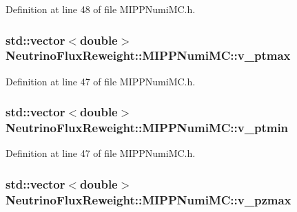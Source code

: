 Definition at line 48 of file M\-I\-P\-P\-Numi\-M\-C.\-h.

\hypertarget{class_neutrino_flux_reweight_1_1_m_i_p_p_numi_m_c_afab2e17efd7d42565f3e1c8a84064349}{
\subsubsection[{v\-\_\-ptmax}]{\setlength{\rightskip}{0pt plus 5cm}std\-::vector$<$double$>$ Neutrino\-Flux\-Reweight\-::\-M\-I\-P\-P\-Numi\-M\-C\-::v\-\_\-ptmax\hspace{0.3cm}{\ttfamily [private]}}}\label{class_neutrino_flux_reweight_1_1_m_i_p_p_numi_m_c_afab2e17efd7d42565f3e1c8a84064349}


Definition at line 47 of file M\-I\-P\-P\-Numi\-M\-C.\-h.

\hypertarget{class_neutrino_flux_reweight_1_1_m_i_p_p_numi_m_c_a105e858db8bf5e6b94a69b196815d98a}{
\subsubsection[{v\-\_\-ptmin}]{\setlength{\rightskip}{0pt plus 5cm}std\-::vector$<$double$>$ Neutrino\-Flux\-Reweight\-::\-M\-I\-P\-P\-Numi\-M\-C\-::v\-\_\-ptmin\hspace{0.3cm}{\ttfamily [private]}}}\label{class_neutrino_flux_reweight_1_1_m_i_p_p_numi_m_c_a105e858db8bf5e6b94a69b196815d98a}


Definition at line 47 of file M\-I\-P\-P\-Numi\-M\-C.\-h.

\hypertarget{class_neutrino_flux_reweight_1_1_m_i_p_p_numi_m_c_ac4e9e478e2456cd112522650850b507c}{
\subsubsection[{v\-\_\-pzmax}]{\setlength{\rightskip}{0pt plus 5cm}std\-::vector$<$double$>$ Neutrino\-Flux\-Reweight\-::\-M\-I\-P\-P\-Numi\-M\-C\-::v\-\_\-pzmax\hspace{0.3cm}{\ttfamily [private]}}}\label{class_neutrino_flux_reweight_1_1_m_i_p_p_numi_m_c_ac4e9e478e2456cd112522650850b507c}


